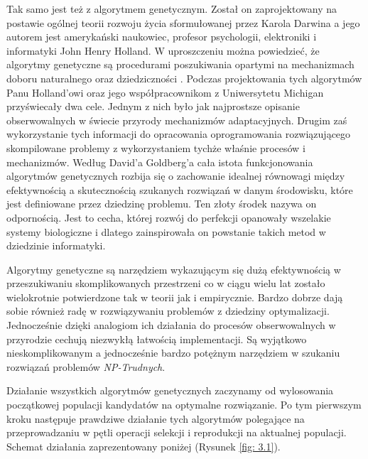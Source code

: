 \documentclass[12pt, oneside, a4paper]{report}
\begin{document}
Tak samo jest też z algorytmem genetycznym. Został on zaprojektowany na postawie ogólnej teorii rozwoju życia sformułowanej przez Karola Darwina a jego autorem jest amerykański naukowiec, profesor psychologii, elektroniki i informatyki John Henry Holland. W uproszczeniu można powiedzieć, że algorytmy genetyczne są procedurami poszukiwania opartymi na mechanizmach doboru naturalnego oraz dziedziczności \citep{goldberg1995algorytmygenetyczne}. Podczas projektowania tych algorytmów Panu Holland'owi oraz jego współpracownikom z Uniwersytetu Michigan przyświecały dwa cele. Jednym z nich było jak najprostsze opisanie obserwowalnych w świecie przyrody mechanizmów adaptacyjnych. Drugim zaś wykorzystanie tych informacji do opracowania oprogramowania rozwiązującego skompilowane problemy z wykorzystaniem tychże właśnie procesów i mechanizmów. Według David'a Goldberg'a cała istota funkcjonowania algorytmów genetycznych rozbija się o zachowanie idealnej równowagi między efektywnością a skutecznością szukanych rozwiązań w danym środowisku, które jest definiowane przez dziedzinę problemu. Ten złoty środek nazywa on odpornością. Jest to cecha, której rozwój do perfekcji opanowały wszelakie systemy biologiczne i dlatego zainspirowała on powstanie takich metod w dziedzinie informatyki.

Algorytmy genetyczne są narzędziem wykazującym się dużą efektywnością w przeszukiwaniu skomplikowanych przestrzeni co w ciągu wielu lat zostało wielokrotnie potwierdzone tak w teorii jak i empirycznie. Bardzo dobrze dają sobie również radę w rozwiązywaniu problemów z dziedziny optymalizacji. Jednocześnie dzięki analogiom ich działania do procesów obserwowalnych w przyrodzie cechują niezwykłą łatwością implementacji. Są wyjątkowo nieskomplikowanym a jednocześnie bardzo potężnym narzędziem w szukaniu rozwiązań problemów \textit{NP-Trudnych}.

Działanie wszystkich algorytmów genetycznych zaczynamy od wylosowania początkowej populacji kandydatów na optymalne rozwiązanie. Po tym pierwszym kroku następuje prawdziwe działanie tych algorytmów polegające na przeprowadzaniu w pętli operacji selekcji i reprodukcji na aktualnej populacji. Schemat działania zaprezentowany poniżej (Rysunek \ref{fig: 3.1}).
\end{document}
